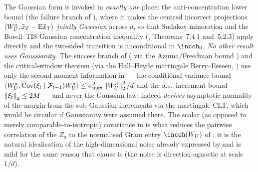 \begin{remark}
\label{rem:gaussian_noise_scope}
The Gaussian form  is invoked in \emph{exactly one}
place: the anti-concentration lower bound 
(the failure branch of ), where it makes the centred incorrect
projections $\left\langle W_U^a, \tilde x_T-\mathbb{E}\tilde x_T \right\rangle$ \emph{jointly Gaussian}
across $a$, so that Sudakov minoration and the Borell--TIS Gaussian
concentration inequality (\cite{vershynin2018}, Theorems~7.4.1 and~5.2.3)
apply directly and the two-sided transition is unconditional in $\incoh_0$.
\emph{No other result uses Gaussianity.} The success branch of
 ( via the
Azuma/Freedman bound ) and the critical-window theorem
 (via the Hall--Heyde martingale Berry--Esseen,
) use only the second-moment information in
 --- the conditional-variance bound
$\left\langle W_U^a, \operatorname{Cov}(\xi_t\mid\mathcal{F}_{t-1})W_U^a \right\rangle\le\sigma_{\max}^2\left\| W_U^a \right\|_2^2/d$
and the a.s.\ increment bound $\left\| \xi_t \right\|_2\le2M$ --- and never the
Gaussian law: indeed  \emph{derives} asymptotic normality of
the margin from the sub-Gaussian increments via the martingale CLT, which
would be circular if Gaussianity were assumed there. The scalar
(as opposed to merely comparable-to-isotropic) covariance in
 is what reduces the pairwise correlation of the
$Z_a$ to the normalised Gram entry $\incoh(W_U)$ of ;
it is the natural idealisation of the high-dimensional noise already
expressed by  and is mild for the same reason that
clause is (the noise is direction-agnostic at scale $1/d$).
\end{remark}
